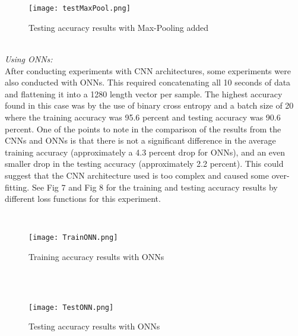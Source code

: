 \documentclass[journal]{IEEEtran}
\begin{document}
\\

\\
\begin{figure}[ht]
    \centering
    \texttt{[image: testMaxPool.png]}
    \caption{Testing accuracy results with Max-Pooling added}
    \label{fig:my_label}
\end{figure}

\\

\emph{Using ONNs:}
\\
After conducting experiments with CNN architectures, some experiments were also conducted with ONNs. This required concatenating all 10 seconds of data and flattening it into a 1280 length vector per sample. The highest accuracy found in this case was by the use of binary cross entropy and a batch size of 20 where the training accuracy was 95.6 percent and testing accuracy was 90.6 percent. One of the points to note in the comparison of the results from the CNNs and ONNs is that there is not a significant difference in the average training accuracy (approximately a 4.3 percent drop for ONNs), and an even smaller drop in the testing accuracy (approximately 2.2 percent). This could suggest that the CNN architecture used is too complex and caused some over-fitting. See Fig 7 and Fig 8 for the training and testing accuracy results by different loss functions for this experiment.

\\
\begin{figure}[ht]
    \centering
    \texttt{[image: TrainONN.png]}
    \caption{Training accuracy results with ONNs}
    \label{fig:my_label}
\end{figure}

\\

\\
\begin{figure}[ht]
    \centering
    \texttt{[image: TestONN.png]}
    \caption{Testing accuracy results with ONNs}
    \label{fig:my_label}
\end{figure}

\\
\end{document}
